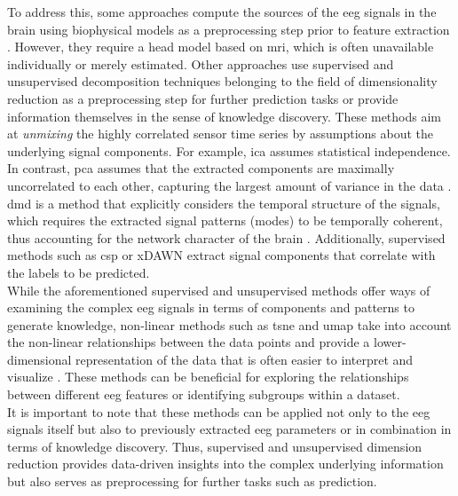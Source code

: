 To address this, some approaches compute the sources of the \gls{eeg} signals in the brain using biophysical models as a preprocessing step prior to feature extraction \cite{Khan2018, Westner2018}. However, they require a head model based on \gls{mri}, which is often unavailable individually or merely estimated. Other approaches use supervised and unsupervised decomposition techniques belonging to the field of dimensionality reduction as a preprocessing step for further prediction tasks or provide information themselves in the sense of knowledge discovery. These methods aim at \textit{unmixing} the highly correlated sensor time series by assumptions about the underlying signal components. For example, \gls{ica} assumes statistical independence. In contrast, \gls{pca} assumes that the extracted components are maximally uncorrelated to each other, capturing the largest amount of variance in the data \cite{CohenX2017}. \Gls{dmd} is a method that explicitly considers the temporal structure of the signals, which requires the extracted signal patterns (modes) to be temporally coherent, thus accounting for the network character of the brain \cite{Brunton2016}. Additionally, supervised methods such as \gls{csp} \cite{Blankertz2008} or xDAWN \cite{Rivet2009} extract signal components that correlate with the labels to be predicted.\\
While the aforementioned supervised and unsupervised methods offer ways of examining the complex \gls{eeg} signals in terms of components and patterns to generate knowledge, non-linear methods such as \gls{tsne} and \gls{umap} take into account the non-linear relationships between the data points and provide a lower-dimensional representation of the data that is often easier to interpret and visualize \cite{Mcinnes2018}. These methods can be beneficial for exploring the relationships between different \gls{eeg} features or identifying subgroups within a dataset.\\
It is important to note that these methods can be applied not only to the \gls{eeg} signals itself but also to previously extracted \gls{eeg} parameters or in combination in terms of knowledge discovery. Thus, supervised and unsupervised dimension reduction provides data-driven insights into the complex underlying information but also serves as preprocessing for further tasks such as prediction.

